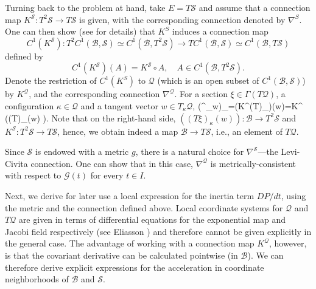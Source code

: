 \documentclass[smallextended]{svjour3}
\begin{document}
Turning back to the problem at hand, take $E=T{\mathcal{S}}$ and assume that a connection map $K^{\mathcal{S}}:T^2{\mathcal{S}}\to T{\mathcal{S}}$  is given, with the corresponding connection denoted by $\nabla^S$. One can then show (see \cite{Eli67} for details) that $K^S$ induces a connection map  
\[
C^1(K^{\mathcal{S}}):T^2C^1({\mathcal{B}},{\mathcal{S}})\simeq C^1({\mathcal{B}},T^2{\mathcal{S}})\to  TC^1({\mathcal{B}},{\mathcal{S}})\simeq C^1({\mathcal{B}},T{\mathcal{S}})
\]
defined by
\[
C^1(K^{\mathcal{S}})(A)=K^{\mathcal{S}}\circ A,\quad A\in C^1({\mathcal{B}},T^2{\mathcal{S}}).
\]
Denote the restriction of $C^1(K^S)$ to ${\mathcal{Q}}$ (which is an open subset of $C^1({\mathcal{B}},{\mathcal{S}})$) by $K^{\mathcal{Q}}$, and the corresponding connection $\nabla^{\mathcal{Q}}$.
For a section $\xi\in\Gamma(T{\mathcal{Q}})$, a configuration $\kappa\in{\mathcal{Q}}$ and a tangent vector $w\in T_\kappa{\mathcal{Q}}$,
\beq
\label{conformula}
(\nabla^{}_w\xi)_\kappa=(K^{}\circ (T\xi)_\kappa)(w)=K^{} \circ\left((T\xi)_\kappa(w) \right).
\eeq
Note that on the right-hand side, $\left((T\xi)_\kappa(w) \right):{\mathcal{B}}\to T^2{\mathcal{S}}$ and $K^{\mathcal{S}}:T^2{\mathcal{S}}\to T{\mathcal{S}}$, hence, we obtain indeed a map ${\mathcal{B}}\to T{\mathcal{S}}$, i.e., an element of $T{\mathcal{Q}}$.

Since ${\mathcal{S}}$ is endowed with a metric $g$, there is a natural choice for $\nabla^{\mathcal{S}}$---the  Levi-Civita connection. One can show that in this case, $\nabla^{\mathcal{Q}}$ is metrically-consistent with respect to ${\mathcal{G}}(t)$ for every $t\in I$.

Next, we derive for later use a local expression for the inertia term $DP/dt$, using  the metric and the connection defined above. Local coordinate systems for ${\mathcal{Q}}$ and $T{\mathcal{Q}}$ are given in terms of differential equations for the exponential map and Jacobi field respectively (see Eliasson \cite{Eli67}) and therefore cannot be given explicitly in the general case. The advantage of working with a connection map $K^{\mathcal{Q}}$, however, is that the covariant derivative can be calculated pointwise (in ${\mathcal{B}}$). We can therefore derive explicit expressions for the acceleration in coordinate neighborhoods  of ${\mathcal{B}}$ and ${\mathcal{S}}$.
\end{document}
